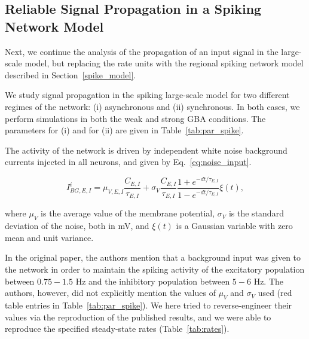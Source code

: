 \subsection{Reliable Signal Propagation in a Spiking Network Model}\label{gba_spk}

Next, we continue the analysis of the propagation of an input signal in the large-scale model, but replacing the rate units with the regional spiking network model described in Section~\ref{spike_model}.

We study signal propagation in the spiking large-scale model for two different regimes of the network: (i) asynchronous and (ii) synchronous. In both cases, we perform simulations in both the weak and strong GBA conditions. The parameters for (i) and for (ii) are given in Table~\ref{tab:par_spike}.

The activity of the network is driven by independent white noise background currents injected in all neurons, and given by Eq.~\ref{eq:noise_input}.

\begin{equation}
    I_{BG,E,I}^{i} = \mu_{V,E,I}\frac{C_{E,I}}{\tau_{E,I}} + \sigma_{V} \frac{C_{ E,I}}{\tau_{E,I}}\frac{1+e^{-dt/\tau_{E,I}}}{1-e^{-dt/\tau_{E,I}}}\xi(t),
    \label{eq:noise_input}
\end{equation}

\noindent where $\mu_{V}$ is the average value of the membrane potential, $\sigma_{V}$ is the standard deviation of the noise, both in mV, and $\xi(t)$ is a Gaussian variable with zero mean and unit variance. 

In the original paper, the authors mention that a background input was given to the network in order to maintain the spiking activity of the excitatory population between $0.75-1.5$ Hz and the inhibitory population between $5-6$ Hz. The authors, however, did not explicitly mention the values of $\mu_V$ and $\sigma_{V}$ used (red table entries in Table~\ref{tab:par_spike}). We here tried to reverse-engineer their values via the reproduction of the published results, and we were able to reproduce the specified steady-state rates (Table~\ref{tab:rates}).

